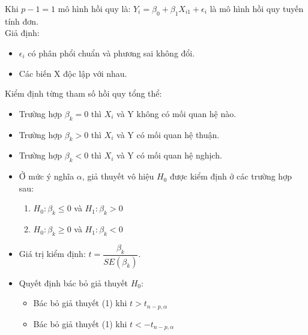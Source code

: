 \documentclass[a4paper]{article}
\newcommand{\gachdau}{\hspace*{1.5em}\ignorespaces}
\begin{document}
            \vspace{-8pt}
            \gachdau
            Khi $p-1=1$ mô hình hồi quy là: $Y_i = \beta_0 + \beta_1X_{i1} + \epsilon_i$ là mô hình hồi quy tuyến tính đơn.\\
            \gachdau
            Giả định:
            \begin{itemize}[leftmargin=3em, itemsep=-1.5em, parsep=1.6em]
                \vspace{-10pt}
                \item \fontsize{13pt}{15pt}\selectfont $\epsilon_i$ có phân phổi chuẩn và phương sai không đổi.
                \item \fontsize{13pt}{15pt}\selectfont Các biến X độc lập với nhau.
            \end{itemize}
            \vspace{-8pt}
            \gachdau
            Kiểm định từng tham số hồi quy tổng thể:
            \begin{itemize}[leftmargin=3em, itemsep=-1.5em, parsep=1.6em]
                \vspace{-6pt}
                \item \fontsize{13pt}{15pt}\selectfont Trường hợp $\beta_k = 0$ thì $X_i$ và Y không có mối quan hệ nào.
                \item \fontsize{13pt}{15pt}\selectfont Trường hợp $\beta_k > 0$ thì $X_i$ và Y có mối quan hệ thuận.
                \item \fontsize{13pt}{15pt}\selectfont Trường hợp $\beta_k < 0$ thì $X_i$ và Y có mối quan hệ nghịch.
                \item \fontsize{13pt}{15pt}\selectfont Ở mức ý nghĩa $\alpha$, giả thuyết vô hiệu $H_0$ được kiểm định ở các trường hợp sau:
                \begin{enumerate}[label=(\arabic*), leftmargin=1.8em, itemsep=-1.5em, parsep=1.6em]
                    \vspace{-25pt}
                    \item \fontsize{13pt}{15pt}\selectfont $H_0: \beta_k \leq 0$ và $H_1: \beta_k > 0$
                    \item \fontsize{13pt}{15pt}\selectfont $H_0: \beta_k \geq 0$ và $H_1: \beta_k < 0$
                \end{enumerate}
                \item \fontsize{13pt}{15pt}\selectfont Giá trị kiểm định: $t = \dfrac{\beta_k}{SE(\beta_k)}$.
                \item \fontsize{13pt}{15pt}\selectfont Quyết định bác bỏ giả thuyết $H_0$:
                \begin{itemize}[leftmargin=1.5em, itemsep=-1.5em, parsep=1.6em]
                    \vspace{-22pt}
                    \item \fontsize{13pt}{15pt}\selectfont Bác bỏ giả thuyết (1) khi $t > t_{n-p,\alpha}$
                    \item \fontsize{13pt}{15pt}\selectfont Bác bỏ giả thuyết (1) khi $t < -t_{n-p,\alpha}$
                \end{itemize}
            \end{itemize}
\end{document}
